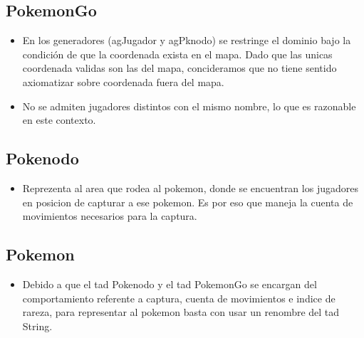 
\subsection{PokemonGo}

\begin{itemize}
\item{En los generadores (agJugador y agPknodo) se restringe el dominio bajo la condici\'on de que la coordenada exista en el mapa. Dado que las unicas coordenada validas son las del mapa, concideramos que no tiene sentido axiomatizar sobre coordenada fuera del mapa.}

\item{No se admiten jugadores distintos con el mismo nombre, lo que es razonable en este contexto.}

\end{itemize}


\subsection{Pokenodo}

\begin{itemize}
\item{Reprezenta al area que rodea al pokemon, donde se encuentran los jugadores en posicion de capturar a ese pokemon. Es por eso que maneja la cuenta de movimientos necesarios para la captura.}
\end{itemize}

\subsection{Pokemon}

\begin{itemize}
\item{Debido a que el tad Pokenodo y el tad PokemonGo se encargan del comportamiento referente a captura, cuenta de movimientos e indice de rareza, para representar al pokemon basta con usar un renombre del tad String.  }
\end{itemize}

